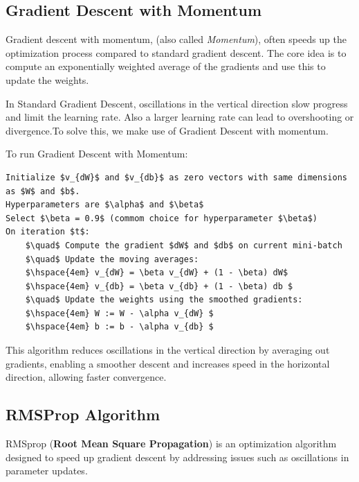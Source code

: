 \documentclass[letterpaper,12pt,notitlepage,twoside]{report}
\begin{document}
\subsection*{Gradient Descent with Momentum}
Gradient descent with momentum, (also called \emph{Momentum}), often speeds up the optimization process compared to standard gradient descent. The core idea is to compute an exponentially weighted average of the gradients and use this to update the weights.

In Standard Gradient Descent, oscillations in the vertical direction slow progress and limit the learning rate. Also a larger learning rate can lead to overshooting or divergence.To solve this, we make use of Gradient Descent with momentum.

To run Gradient Descent with Momentum:
\begin{lstlisting}
Initialize $v_{dW}$ and $v_{db}$ as zero vectors with same dimensions as $W$ and $b$.
Hyperparameters are $\alpha$ and $\beta$
Select $\beta = 0.9$ (commom choice for hyperparameter $\beta$)
On iteration $t$: 
	$\quad$ Compute the gradient $dW$ and $db$ on current mini-batch
	$\quad$ Update the moving averages:
	$\hspace{4em} v_{dW} = \beta v_{dW} + (1 - \beta) dW$
	$\hspace{4em} v_{db} = \beta v_{db} + (1 - \beta) db $
	$\quad$ Update the weights using the smoothed gradients:
	$\hspace{4em} W := W - \alpha v_{dW} $
	$\hspace{4em} b := b - \alpha v_{db} $		
\end{lstlisting}
This algorithm reduces oscillations in the vertical direction by averaging out gradients, enabling a smoother descent and increases speed in the horizontal direction, allowing faster convergence.

\subsection*{RMSProp Algorithm}
RMSprop (\textbf{Root Mean Square Propagation}) is an optimization algorithm designed to speed up gradient descent by addressing issues such as oscillations in parameter updates.
\end{document}
